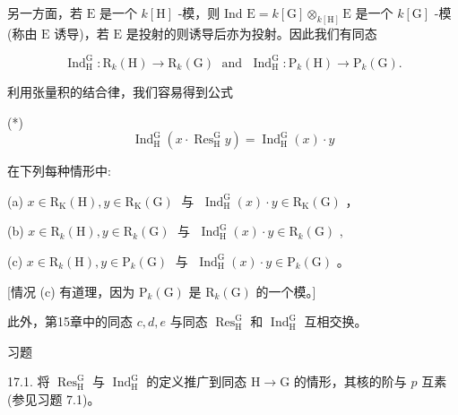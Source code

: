 \documentclass[10pt]{article}
\begin{document}
另一方面，若 \(\mathrm{E}\) 是一个 \(k\left\lbrack  \mathrm{H}\right\rbrack\) -模，则 Ind \(\mathrm{E} = k\left\lbrack  \mathrm{G}\right\rbrack  { \otimes  }_{k\left\lbrack  \mathrm{H}\right\rbrack  }\mathrm{E}\) 是一个 \(k\left\lbrack  \mathrm{G}\right\rbrack\) -模(称由 \(\mathrm{E}\) 诱导)，若 \(\mathrm{E}\) 是投射的则诱导后亦为投射。因此我们有同态

\[
{\operatorname{Ind}}_{\mathrm{H}}^{\mathrm{G}} : {\mathrm{R}}_{k}\left( \mathrm{H}\right)  \rightarrow  {\mathrm{R}}_{k}\left( \mathrm{G}\right) \;\text{ and }\;{\operatorname{Ind}}_{\mathrm{H}}^{\mathrm{G}} : {\mathrm{P}}_{k}\left( \mathrm{H}\right)  \rightarrow  {\mathrm{P}}_{k}\left( \mathrm{G}\right) .
\]

利用张量积的结合律，我们容易得到公式

(*)
\[
{\operatorname{Ind}}_{\mathrm{H}}^{\mathrm{G}}\left( {x \cdot  {\operatorname{Res}}_{\mathrm{H}}^{\mathrm{G}}y}\right)  = {\operatorname{Ind}}_{\mathrm{H}}^{\mathrm{G}}\left( x\right)  \cdot  y
\]

在下列每种情形中:

(a) \(x \in  {\mathrm{R}}_{\mathrm{K}}\left( \mathrm{H}\right) ,y \in  {\mathrm{R}}_{\mathrm{K}}\left( \mathrm{G}\right) \;\) 与 \(\;{\operatorname{Ind}}_{\mathrm{H}}^{\mathrm{G}}\left( x\right)  \cdot  y \in  {\mathrm{R}}_{\mathrm{K}}\left( \mathrm{G}\right)\) ，

(b) \(x \in  {\mathrm{R}}_{k}\left( \mathrm{H}\right) ,y \in  {\mathrm{R}}_{k}\left( \mathrm{G}\right) \;\) 与 \(\;{\operatorname{Ind}}_{\mathrm{H}}^{\mathrm{G}}\left( x\right)  \cdot  y \in  {\mathrm{R}}_{k}\left( \mathrm{G}\right)\) ,

(c) \(x \in  {\mathrm{R}}_{k}\left( \mathrm{H}\right) ,y \in  {\mathrm{P}}_{k}\left( \mathrm{G}\right) \;\) 与 \(\;{\operatorname{Ind}}_{\mathrm{H}}^{\mathrm{G}}\left( x\right)  \cdot  y \in  {\mathrm{P}}_{k}\left( \mathrm{G}\right)\) 。

[情况 (c) 有道理，因为 \({\mathrm{P}}_{k}\left( \mathrm{G}\right)\) 是 \({\mathrm{R}}_{k}\left( \mathrm{G}\right)\) 的一个模。]

此外，第15章中的同态 \(c,d,e\) 与同态 \({\operatorname{Res}}_{\mathrm{H}}^{\mathrm{G}}\) 和 \({\operatorname{Ind}}_{\mathrm{H}}^{\mathrm{G}}\) 互相交换。

习题

17.1. 将 \({\operatorname{Res}}_{\mathrm{H}}^{\mathrm{G}}\) 与 \({\operatorname{Ind}}_{\mathrm{H}}^{\mathrm{G}}\) 的定义推广到同态 \(\mathrm{H} \rightarrow  \mathrm{G}\) 的情形，其核的阶与 \(p\) 互素(参见习题 7.1)。
\end{document}
